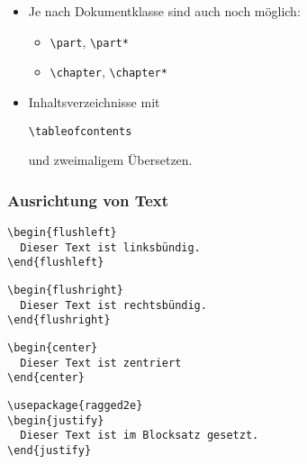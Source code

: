 \begin{frame}[fragile]
\begin{itemize}
  \item<+-> Je nach Dokumentklasse sind auch noch möglich:
    \begin{itemize}
    \item \lstinline!\part!, \lstinline!\part*!
    \item \lstinline!\chapter!, \lstinline!\chapter*!
    \end{itemize}
  \item<+-> Inhaltsverzeichnisse mit
\begin{lstlisting}
\tableofcontents
\end{lstlisting}
    und zweimaligem Übersetzen.
  \end{itemize}

\end{frame}
\begin{frame}
  \frametitle{Ausrichtung von Text}

  \onslide<+->

\begin{lstlisting}
\begin{flushleft}
  Dieser Text ist linksbündig.
\end{flushleft}
\end{lstlisting}

  \onslide<+->

\begin{lstlisting}
\begin{flushright}
  Dieser Text ist rechtsbündig.
\end{flushright}
\end{lstlisting}

  \onslide<+->

\begin{lstlisting}
\begin{center}
  Dieser Text ist zentriert
\end{center}
\end{lstlisting}

  \onslide<+->

\begin{lstlisting}
\usepackage{ragged2e}
\begin{justify}
  Dieser Text ist im Blocksatz gesetzt.
\end{justify}
\end{lstlisting}

\end{frame}

